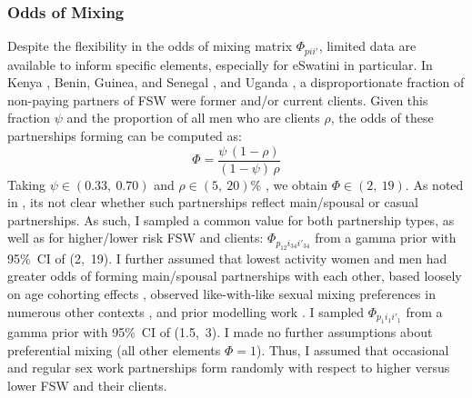 \subsubsection{Odds of Mixing}
Despite the flexibility in the odds of mixing matrix $\Phi_{pii'}$,
limited data are available to inform specific elements,
especially for eSwatini in particular.
In Kenya \cite{Voeten2007}, Benin, Guinea, and Senegal \cite{Godin2008}, and Uganda \cite{Mbonye2022},
a disproportionate fraction of non-paying partners of FSW were former and/or current clients.
Given this fraction $\psi$ and the proportion of all men who are clients $\rho$,
the odds of these partnerships forming can be computed as:
\begin{equation}
  \Phi = \frac{\psi\,(1-\rho)}{(1-\psi)\,\rho}
\end{equation}
Taking $\psi \in (0.33,~0.70)$ \cite{Voeten2007,Godin2008}
and $\rho \in (5,~20)\%$ \cite{Hodgins2022}, we obtain $\Phi \in (2,~19)$.
As noted in , its not clear whether such partnerships reflect
main/spousal or casual partnerships.
As such, I sampled a common value for both partnership types,
as well as for higher/lower risk FSW and clients:
$\Phi_{p_{12}i_{34}i'_{34}}$ from a gamma prior with 95\%~CI of (2,~19).
I further assumed that lowest activity women and men had
greater odds of forming main/spousal partnerships with each other,
based loosely on age cohorting effects \cite{Leclerc-Madlala2008},
observed like-with-like sexual mixing preferences in numerous other contexts
\cite{Morris1991,Garnett1993a,Admiraal2016},
and prior modelling work \cite{Knight2022-sr}.
I sampled $\Phi_{p_{1}i_{1}i'_{1}}$ from a gamma prior with 95\%~CI of (1.5,~3).
I made no further assumptions about preferential mixing (\ie all other elements $\Phi = 1$).
Thus, I assumed that occasional and regular sex work partnerships form
randomly with respect to higher versus lower FSW and their clients.
